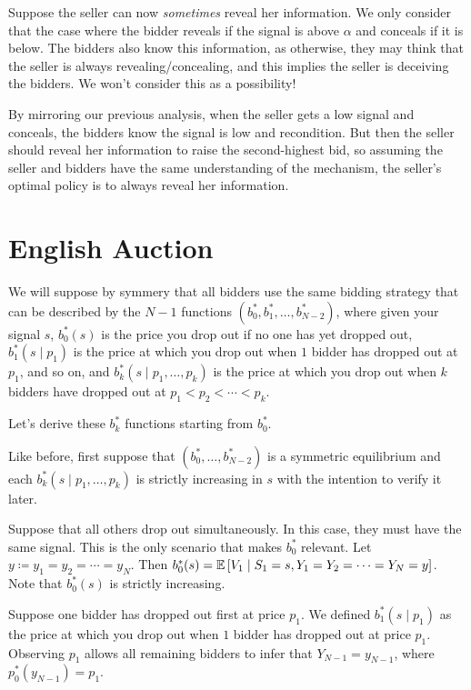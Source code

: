 Suppose the seller can now \emph{sometimes} reveal her information. We only consider that the case where the bidder reveals if the signal is above $\alpha$ and conceals if it is below. The bidders also know this information, as otherwise, they may think that the seller is always revealing/concealing, and this implies the seller is deceiving the bidders. We won't consider this as a possibility!

By mirroring our previous analysis, when the seller gets a low signal and conceals, the bidders know the signal is low and recondition. But then the seller should reveal her information to raise the second-highest bid, so assuming the seller and bidders have the same understanding of the mechanism, the seller's optimal policy is to always reveal her information.

\section{English Auction}
We will suppose by symmery that all bidders use the same bidding strategy that can be described by the $N-1$ functions $\left( b^*_0, b_1^*,\ldots,b_{N-2}^{*} \right)$, where given your signal $s$, $b_0^*(s)$ is the price you drop out if no one has yet dropped out, $b_1^*(s \mid p_1)$ is the price at which you drop out when $1$ bidder has dropped out at $p_1$, and so on, and $b_k^*(s \mid p_1,\ldots,p_k)$ is the price at which you drop out when $k$ bidders have dropped out at $p_1 < p_2 < \cdots < p_k$.

Let's derive these $b_k^*$ functions starting from $b_0^*$.

Like before, first suppose that $\left( b_0^*,\ldots,b_{N-2}^{*} \right)$ is a symmetric equilibrium and each $b_k^*(s \mid p_1,\ldots,p_k)$ is strictly increasing in $s$ with the intention to verify it later.

Suppose that all others drop out simultaneously. In this case, they must have the same signal. This is the only scenario that makes $b_0^*$ relevant. Let $y \coloneqq y_1=y_2= \cdots = y_N$. 
Then $b^*_0(s) = \mathbb{E}\left[V_1 \mid S_1 = s, Y_1 = Y_2 = \cdots = Y_N = y\right]$. Note that $b_0^*(s)$ is strictly increasing.

Suppose one bidder has dropped out first at price $p_1$. We defined $b_1^*(s \mid p_1)$ as the price at which you drop out when $1$ bidder has dropped out at price $p_1$. 
Observing $p_1$ allows all remaining bidders to infer that $Y_{N-1} = y_{N-1}$, where $p_0^*(y_{N-1}) = p_1$.

